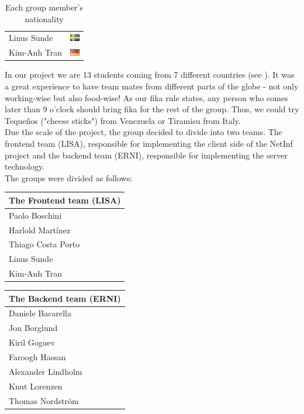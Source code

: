 \begin{table}
\begin{tabular}{|l|c|}
Linus Sunde & \includegraphics{graphics/se.png} \\
Kim-Anh Tran & \includegraphics{graphics/de.png} \\
\hline
\end{tabular}
\caption{Each group member's nationality}\label{tab:nationality}
\end{table}

In our project we are 13 students coming from 7 different countries (see ).
It was a great experience to have team mates from different parts of the globe - not
only working-wise but also food-wise! As our fika rule states, any person who comes later
than 9 o'clock should bring fika for the rest of the group. Thus, we could
try Teque\~{n}os ("cheese sticks") from Venezuela or Tiramisu from Italy.\\

Due the scale of the project, the group decided to divide into two teams. 
The frontend team (LISA), responsible for implementing the client side of the NetInf project and the backend team (ERNI), responsible for implementing the server technology.\\

The groups were divided as follows:

\begin{minipage}[b]{0.32\hsize}\centering
\begin{tabular}{l}
The Frontend team (LISA) \\\hline
Paolo Boschini\\
Harlold Mart\'{i}nez\\
Thiago Costa Porto\\
Linus Sunde\\
Kim-Anh Tran
\end{tabular}
\end{minipage}
\hfill
\begin{minipage}[b]{0.32\hsize}\centering
\begin{tabular}{l}
The Backend team (ERNI) \\\hline
Daniele Bacarella\\
Jon Borglund\\
Kiril Goguev\\
Faroogh Hassan\\
Alexander Lindholm\\
Knut Lorenzen\\
Thomas Nordstr\"om
\end{tabular}
\end{minipage}

